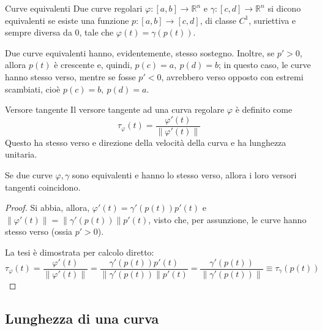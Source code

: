 \documentclass[10pt, a4paper]{scrartcl}
\theoremstyle{definition}
\numberwithin{esempio}{section}
\theoremstyle{definition}
\numberwithin{obs}{section}
\numberwithin{nota}{section}
\numberwithin{equation}{subsection}
\begin{document}
\begin{definizione}
	{Curve equivalenti}{}
	Due curve regolari $\varphi :\left[ a,b \right] \to \mathbb{R}^n $ e $\gamma: \left[ c,d \right] \to \mathbb{R}^n$ si dicono equivalenti se esiste una funzione $p:\left[ a,b \right] \to \left[ c,d \right] $, di classe $C^1$, suriettiva e sempre diversa da $0$, tale che $\varphi (t) = \gamma(p(t))$.
\end{definizione}
\noindent Due curve equivalenti hanno, evidentemente, stesso sostegno.
Inoltre, se $p'>0$, allora $p(t)$ \`e crescente e, quindi, $p(c) = a, \ p(d) = b$; in questo caso, le curve hanno stesso verso, mentre se fosse $p'<0$, avrebbero verso opposto con estremi scambiati, cio\`e $p(c) = b, \ p(d) = a$.
\begin{definizione}
	{Versore tangente}{}
	Il versore tangente ad una curva regolare $\varphi $ \`e definito come
	\[
	\tau _\varphi (t) = \frac{\varphi '(t)}{\left\lVert \varphi '(t) \right\rVert }
	\] 
Questo ha stesso verso e direzione della velocit\`a della curva e ha lunghezza unitaria.	
\end{definizione}
\begin{teorema}
	{}{}
	Se due curve $\varphi , \gamma$ sono equivalenti e hanno lo stesso verso, allora i loro versori tangenti coincidono.
	\begin{proof}
		Si abbia, allora, $\varphi '(t) = \gamma'(p(t)) p'(t)$ e $\left\lVert \varphi '(t) \right\rVert = \left\lVert \gamma'(p(t)) \right\rVert p'(t)$, visto che, per assunzione, le curve hanno stesso verso (ossia $p' > 0$).

		La tesi \`e dimostrata per calcolo diretto:
		\[
		\tau _\varphi  (t) = \frac{\varphi '(t) }{\left\lVert \varphi '(t) \right\rVert } = \frac{\gamma'(p(t)) p'(t)}{\left\lVert \gamma'(p(t)) \right\rVert p'(t)}=\frac{\gamma'(p(t))}{\left\lVert \gamma'(p(t)) \right\rVert }\equiv \tau _\gamma(p(t))
		\] 
	\end{proof}
\end{teorema}
\subsection{Lunghezza di una curva}
\end{document}
